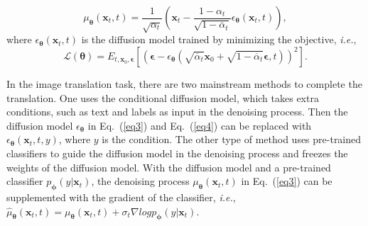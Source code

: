 \begin{equation}
    \label{eq3}
    {\mu}_{\boldsymbol{\theta}}(\mathbf{x}_t,t)=\frac{1}{\sqrt{\alpha_t}}(\mathbf{x}_t-\frac{1-\alpha_t}{\sqrt{1-\overline{\alpha}_t}}\epsilon_{\boldsymbol{\theta}}(\mathbf{x}_t,t)),
\end{equation}
where $\epsilon_{\boldsymbol{\theta}}(\mathbf{x}_t,t)$ is the diffusion model trained by minimizing the objective, \textit{i.e.},
\begin{equation}
\label{eq4}
\mathcal{L}(\boldsymbol{\theta})=E_{t,\mathbf{x}_0,\boldsymbol{\epsilon}}[(\boldsymbol{\epsilon}-\epsilon_{\boldsymbol{\theta}}(\sqrt{\overline{\alpha}_t}\mathbf{x}_0+\sqrt{1-\overline{\alpha}_t}\boldsymbol{\epsilon},t))^2].
\end{equation}

In the image translation task, there are two mainstream methods to complete the translation. One uses the conditional diffusion model, which takes extra conditions, such as text and labels as input in the denoising process. Then the diffusion model $\epsilon_{\boldsymbol{\theta}}$ in Eq.~(\ref{eq3}) and Eq.~(\ref{eq4}) can be replaced with $\epsilon_{\boldsymbol{\theta}}(\mathbf{x}_t,t,y)$, where $y$ is the condition.
The other type of method \cite{dhariwal2021diffusion} uses pre-trained classifiers to guide the diffusion model in the denoising process and freezes the weights of the diffusion model. With the diffusion model and a pre-trained classifier $p_{\boldsymbol{\phi}}(y|\mathbf{x}_t)$, the denoising process $\mu_{\boldsymbol{\theta}}(\mathbf{x}_t,t)$ in Eq.~(\ref{eq3}) can be supplemented with the gradient of the classifier, \textit{i.e.}, $\hat{\mu}_{\boldsymbol{\theta}}(\mathbf{x}_t,t)=\mu_{\boldsymbol{\theta}}(\mathbf{x}_t,t) + \sigma_t\nabla log p_{\boldsymbol{\phi}}(y|\mathbf{x}_t)$. 
